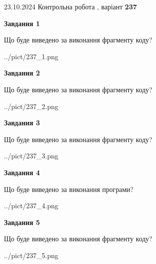 \documentclass[12pt, ukrainian]{article}
\begin{document}
{\Large{23.10.2024 Контрольна робота , варіант  \No \textbf { 237 }\par}}
{
\begin {large}
{\begin {center}\textbf{Завдання 1}\end {center}}

Що буде виведено за виконання фрагменту коду?\par
\begin{center}
	{../pict/237_1.png}
\end{center}
\newpage

{\begin {center}\textbf{Завдання 2}\end {center}}

Що буде виведено за виконання фрагменту коду?\par
\begin{center}
	{../pict/237_2.png}
\end{center}
\newpage

{\begin {center}\textbf{Завдання 3}\end {center}}

Що буде виведено за виконання фрагменту коду?\par
\begin{center}
	{../pict/237_3.png}
\end{center}
\newpage

{\begin {center}\textbf{Завдання 4}\end {center}}

Що буде виведено за виконання програми?\par
\begin{center}
	{../pict/237_4.png}
\end{center}
\newpage

{\begin {center}\textbf{Завдання 5}\end {center}}

Що буде виведено за виконання фрагменту коду?\par
\begin{center}
	{../pict/237_5.png}
\end{center}
\newpage


\end{large}}
\end{document}
